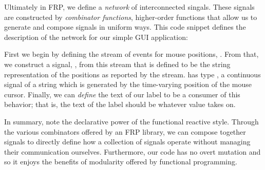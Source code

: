 Ultimately in FRP, we define a \emph{network} of interconnected singals.
These signals are constructed by \emph{combinator functions}, higher-order functions that allow us to generate and compose signals in uniform ways.
This code snippet defines the description of the network for our simple GUI application:
First we begin by defining the stream of events for mouse positions, .
From that, we construct a signal, , from this stream that is defined to be the string representation of the positions as reported by the stream.
 has type , a continuous signal of a string which is generated by the time-varying position of the mouse cursor.
Finally, we can \emph{define} the text of our label to be a consumer of this behavior; that is, the text of the label should be whatever  value  takes on.

In summary, note the declarative power of the functional reactive style.
Through the various combinators offered by an FRP library, we can compose together signals to directly define how a collection of signals operate without managing their communication ourselves.
Furthermore, our code has no overt mutation and so it enjoys the benefits of modularity offered by functional programming.
